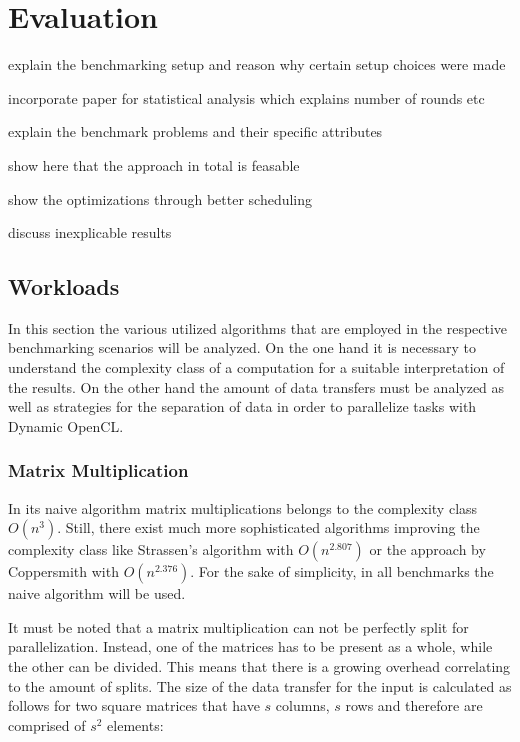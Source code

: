 \chapter{Evaluation}



explain the benchmarking setup and reason why certain setup choices were made

incorporate paper for statistical analysis which explains number of rounds etc

explain the benchmark problems and their specific attributes

show here that the approach in total is feasable

show the optimizations through better scheduling

discuss inexplicable results


\section{Workloads}

In this section the various utilized algorithms that are employed in the respective benchmarking scenarios will be analyzed. On the one hand it is necessary to understand the complexity class of a computation for a suitable interpretation of the results. On the other hand the amount of data transfers must be analyzed as well as strategies for the separation of data in order to parallelize tasks with Dynamic OpenCL.

\subsection*{Matrix Multiplication}
In its naive algorithm matrix multiplications belongs to the complexity class $O(n^3)$. Still, there exist much more sophisticated algorithms improving the complexity class like Strassen's algorithm with $O(n^{2.807})$\cite{strassen} or the approach by Coppersmith with $O(n^{2.376})$\cite{coppersmith}. For the sake of simplicity, in all benchmarks the naive algorithm will be used.

It must be noted that a matrix multiplication can not be perfectly split for parallelization. Instead, one of the matrices has to be present as a whole, while the other can be divided. This means that there is a growing overhead correlating to the amount of splits. The size of the data transfer for the input is calculated as follows for two square matrices that have $s$ columns, $s$ rows and therefore are comprised of $s^2$ elements:

